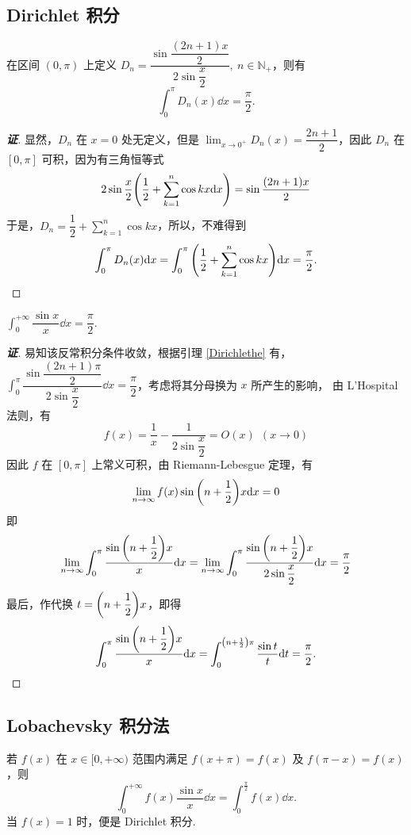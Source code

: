 \subsection{Dirichlet 积分}

\begin{lemma}[Dirichlet 核]
    \label{Dirichlethe}
    在区间 $(0,\pi)$ 上定义 $D_n=\dfrac{\sin\dfrac{(2n+1)x}{2}}{2\sin\dfrac{x}{2}},~n\in\mathbb{N}_+$，则有 $$\int_{0}^{\pi}D_n(x)\dd x=\dfrac{\pi}{2}.$$
\end{lemma}
\begin{proof}[{\songti \textbf{证}}]
    显然，$D_n$ 在 $x=0$ 处无定义，但是 $\displaystyle\lim_{x\to0^+}D_n(x)=\dfrac{2n+1}{2}$，因此 $D_n$ 在 $[0,\pi]$ 可积，因为有三角恒等式
    $$2\sin\dfrac{x}{2}\qty(\dfrac{1}{2}+\sum_{k=1}^{n}\cos kx\dd x)=\sin\dfrac{(2n+1)x}{2}$$
    于是，$\displaystyle D_n=\dfrac{1}{2}+\sum_{k=1}^{n}\cos kx$，所以，不难得到
    $$\int_{0}^{\pi}D_n(x)\dd x=\int_{0}^{\pi}\qty(\dfrac{1}{2}+\sum_{k=1}^{n}\cos kx)\dd x=\dfrac{\pi}{2}.$$
\end{proof}

\begin{theorem}
    $\displaystyle\int_{0}^{+\infty}\dfrac{\sin x}{x}\dd x=\dfrac{\pi}{2}.$
\end{theorem}
\begin{proof}[{\songti \textbf{证}}]
    易知该反常积分条件收敛，根据引理 \ref{Dirichlethe} 有，$\displaystyle\int_{0}^{\pi}\dfrac{\sin\dfrac{(2n+1)\pi}{2}}{2\sin\dfrac{x}{2}}\dd x=\dfrac{\pi}{2}$，考虑将其分母换为 $x$ 所产生的影响，
    由 L'Hospital 法则，有 $$f(x)=\dfrac{1}{x}-\dfrac{1}{2\sin\dfrac{x}{2}}=O(x)~~ (x\to0)$$
    因此 $f$ 在 $[0,\pi]$ 上常义可积，由 Riemann-Lebesgue 定理，有
    $$\lim_{n\to\infty}f(x)\sin\qty(n+\dfrac{1}{2})x\dd x=0$$
    即 $$\lim_{n\to\infty}\int_{0}^{\pi}\dfrac{\sin\qty(n+\dfrac{1}{2})x}{x}\dd x=\lim_{n\to\infty}\int_{0}^{\pi}\dfrac{\sin\qty(n+\dfrac{1}{2})x}{2\sin\dfrac{x}{2}}\dd x=\dfrac{\pi}{2}$$
    最后，作代换 $t=\qty(n+\dfrac{1}{2})x$，即得 $$\int_{0}^{\pi}\dfrac{\sin\qty(n+\dfrac{1}{2})x}{x}\dd x=\int_{0}^{\qty(n+\frac{1}{2})\pi}\dfrac{\sin t}{t}\dd t=\dfrac{\pi}{2}.$$
\end{proof}

\subsection{Lobachevsky 积分法}

\begin{theorem}
    若 $f(x)$ 在 $x\in[0,+\infty)$ 范围内满足 $f(x+\pi)=f(x)$ 及 $f(\pi-x)=f(x)$，则
    $$\int_{0}^{+\infty}f(x)\dfrac{\sin x}{x}\dd x=\int_{0}^{\frac{\pi}{2}}f(x)\dd x.$$
    当 $f(x)=1$ 时，便是 Dirichlet 积分.
\end{theorem}

